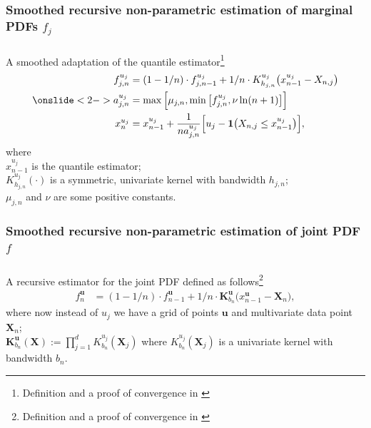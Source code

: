 \documentclass[aspectratio=169]{beamer}
\begin{document}
		\subsubsection{Smoothed recursive non-parametric estimation of marginal PDFs $ f_j $}
			\begin{frame}
				\frametitle{\insertsubsubsection}
				
				A smoothed adaptation of the quantile estimator\footnote{Definition and a proof of convergence in \textcite{Amiri2014}}
				\begin{align}
					f^{u_j}_{j, n} &= (1- 1/n) \cdot f^{u_j}_{j, n-1} + 1/n \cdot K^{u_j}_{h_{j, n}}\big(x^{u_j}_{n-1} - X_{n, j}\big) \\
					\onslide<2->a^{u_j}_{j, n} &= \max\Big[\mu_{j, n}, \min\big[f^{u_j}_{j, n}, \nu \ln(n+1)\big]\Big] \\
					x^{u_j}_n &= x^{u_j}_{n-1} + \frac{1}{n a^{u_j}_{j, n}}\Big[u_j - \mathbf{1}\big(X_{n, j}\leq x^{u_j}_{n-1}\big)\Big],
				\end{align}
				where \\
				$ x^{u_j}_{n-1} $ is the quantile estimator;\\
				$ K_{h_{j, n}}^{u_j}(\cdot) $ is a symmetric, univariate kernel with bandwidth $ h_{j,n} $;\\
				$ \mu_{j, n} $ and $ \nu $ are some positive constants.
				
			\end{frame}			
			
		\subsubsection{Smoothed recursive non-parametric estimation of joint PDF $ f $}
			\begin{frame}
				\frametitle{\insertsubsubsection}
				
				A recursive estimator for the joint PDF defined as follows\footnote{Definition and a proof of convergence in \textcite{Mokkadem2009}}
				\begin{align}
					f^{\mathbf{u}}_n &= (1- 1/n) \cdot f^{\mathbf{u}}_{n-1} + 1/n \cdot \mathbf{K}_{b_n}^{\mathbf{u}} \big(x_{n-1}^{\mathbf{u}} - \mathbf{X}_n\big),
				\end{align}
				where now instead of $ u_j $ we have a grid of points $ \mathbf{u} $ and multivariate data point $ \mathbf{X}_n $; \\
				$ \mathbf{K}_{b_n}^{\mathbf{u}}(\mathbf{X}) := \prod_{j=1}^{d}K_{b_{n}}^{u_j}(\mathbf{X}_j) $ where $ K_{b_{n}}^{u_j}(\mathbf{X}_j) $ is a univariate kernel with bandwidth $ b_{n} $.
				
			\end{frame}
			
\end{document}

